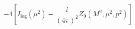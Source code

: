 \begin{equation}
-4[I_{\log }(\mu ^{2})-\frac{i}{(4\pi )^{2}}Z_{0}(M^{2},\mu ^{2},p^{2})]
\end{equation}

